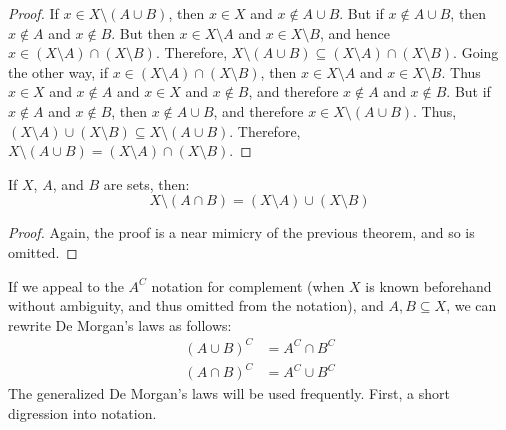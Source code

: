             \begin{proof}
                If $x\in{X}\setminus(A\cup{B})$, then
                $x\in{X}$ and $x\notin{A}\cup{B}$. But if
                $x\notin{A}\cup{B}$, then $x\notin{A}$ and
                $x\notin{B}$. But then
                $x\in{X}\setminus{A}$ and $x\in{X}\setminus{B}$, and
                hence $x\in(X\setminus{A})\cap(X\setminus{B})$. Therefore,
                $X\setminus(A\cup{B})\subseteq(X\setminus{A})\cap(X\setminus{B})$.
                Going the other way, if
                $x\in(X\setminus{A})\cap(X\setminus{B})$, then
                $x\in{X}\setminus{A}$ and $x\in{X}\setminus{B}$. Thus
                $x\in{X}$ and $x\notin{A}$ and $x\in{X}$ and $x\notin{B}$, and
                therefore $x\notin{A}$ and $x\notin{B}$. But if $x\notin{A}$
                and $x\notin{B}$, then $x\notin{A}\cup{B}$, and therefore
                $x\in{X}\setminus(A\cup{B})$. Thus,
                $(X\setminus{A})\cup(X\setminus{B})\subseteq{X}\setminus(A\cup{B})$.
                Therefore,
                $X\setminus(A\cup{B})=(X\setminus{A})\cap(X\setminus{B})$.
            \end{proof}
            \begin{theorem}
                If $X$, $A$, and $B$ are sets, then:%
                \begin{equation}
                    X\setminus(A\cap{B})=
                    (X\setminus{A})\cup(X\setminus{B})
                \end{equation}
            \end{theorem}
            \begin{proof}
                Again, the proof is a near mimicry of the previous theorem,
                and so is omitted.
            \end{proof}
            If we appeal to the $A^{C}$ notation for complement (when
            $X$ is known beforehand without ambiguity, and thus omitted from
            the notation), and $A,B\subseteq{X}$, we can rewrite De Morgan's
            laws as follows:
            \begin{align}
                (A\cup{B})^{C}&=A^{C}\cap{B}^{C}\\
                (A\cap{B})^{C}&=A^{C}\cup{B}^{C}
            \end{align}
            The generalized De Morgan's laws will be used frequently. First, a
            short digression into notation.
